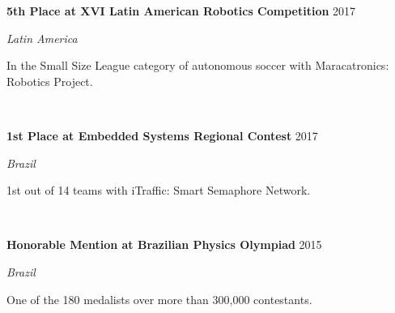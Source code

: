 \documentclass[letterpaper,10pt]{article}
\newcommand{\entry}[4]{

\begin{minipage}[t]{.15\textwidth}
\end{minipage}
\hfill\vline\hfill 
\begin{minipage}[t]{0.95\textwidth}
#2 \hfill \textsc{#1}

\textit{#3}

\footnotesize{#4}
\end{minipage}\\\vspace{.25cm}}
\newcommand{\mycomment}[1]{}
\begin{document}
\entry{2017}{\textbf{5th Place at XVI Latin American Robotics Competition}}{Latin America}{
	In the Small Size League category of autonomous soccer with Maracatronics: Robotics Project.
}

\entry{2017}{\textbf{1st Place at Embedded Systems Regional Contest}}{Brazil}{
	1st out of 14 teams with iTraffic: Smart Semaphore Network.
}

\entry{2015}{\textbf{Honorable Mention at Brazilian Physics Olympiad}}{Brazil}{
	One of the 180 medalists over more than 300,000 contestants.
}
\vspace*{-.25cm}

\end{document}
